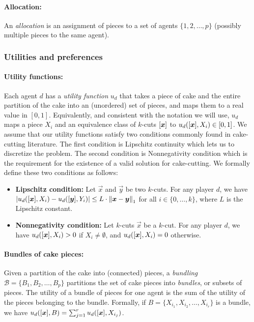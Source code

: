 \paragraph{Allocation:}
An {\em allocation} is an assignment of pieces to a set of agents $\{1, 2, \ldots, p\}$ (possibly multiple pieces to the same agent). 

\subsubsection*{Utilities and preferences}

\paragraph{Utility functions:}
Each agent $d$ has a {\em utility function} $u_d$ that takes a piece of cake and the entire partition of the cake into an (unordered) set of pieces, and maps them to a real value in $[0,1]$. Equivalently, and consistent with the notation we will use, $u_d$ maps a piece $X_i$ and an equivalence class of $k$-cuts $[\boldsymbol{x}]$ to $u_d([\boldsymbol{x}], X_i) \in [0,1]$. We assume that our utility functions satisfy two conditions commonly found in cake-cutting literature. The first condition is Lipschitz continuity which lets us to discretize the problem. The second condition is Nonnegativity condition which is the requirement for the existence of a valid solution for cake-cutting. We formally define these two conditions as follows:

\begin{itemize}
    \item \textbf{Lipschitz condition:} Let $\vec{x}$ and $\vec{y}$ be two $k$-cuts. For any player $d$, we have $|u_d([\boldsymbol{x}], X_i) - u_d([\boldsymbol{y}], Y_i)| \leq L \cdot \left \| {\boldsymbol{x} - \boldsymbol{y}} \right\|_{1}$ for all $i \in \{0, \ldots, k\}$, where $L$ is the Lipschitz constant.

    \item \textbf{Nonnegativity condition:} Let $k$-cuts $\vec{x}$ be a $k$-cut. For any player $d$, we have $u_d([\boldsymbol{x}], X_i) > 0$ if $X_i \neq \emptyset$, and $u_d([\boldsymbol{x}], X_i) = 0$ otherwise.
\end{itemize}

\paragraph{Bundles of cake pieces:}
Given a partition of the cake into (connected) pieces, a {\em bundling} $\mathcal{B} = \{B_1, B_2, \ldots, B_{p}\}$ partitions the set of cake pieces into {\em bundles}, or subsets of pieces. The utility of a bundle of pieces for one agent is the sum of the utility of the pieces belonging to the bundle. Formally, if $B = \{X_{i_1}, X_{i_2}, \ldots, X_{i_r} \}$ is a bundle, we have $u_d([\boldsymbol{x}], B) = \sum_{j=1}^r u_d([\boldsymbol{x}], X_{i_j})$.


